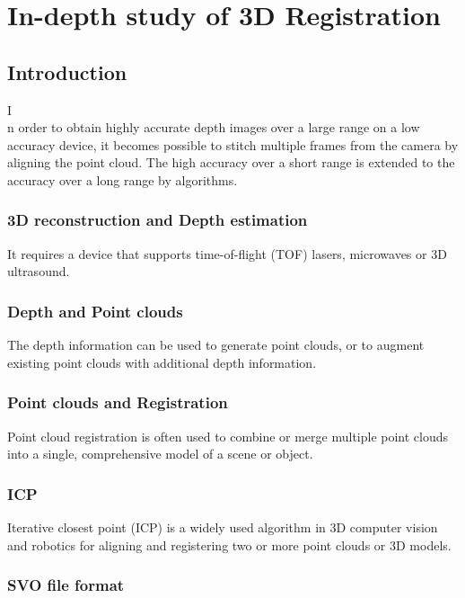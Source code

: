 \chapter{In-depth study of 3D Registration}

\section{Introduction}
\lettrine[lines=2]{I}\\n order to obtain highly accurate depth images over a large range on a low accuracy device, it becomes possible to stitch multiple frames from the camera by aligning the point cloud.
The high accuracy over a short range is extended to the accuracy over a long range by algorithms.

\subsection{3D reconstruction and Depth estimation}
 
It requires a device that supports time-of-flight (TOF) lasers, microwaves or 3D ultrasound. 

\subsection{Depth and Point clouds}

The depth information can be used to generate point clouds, or to augment existing point clouds with additional depth information. 

\subsection{Point clouds and Registration}

Point cloud registration is often used to combine or merge multiple point clouds into a single, comprehensive model of a scene or object. 

\subsection{ICP}

Iterative closest point (ICP) is a widely used algorithm in 3D computer vision and robotics for aligning and registering two or more point clouds or 3D models. 

\subsection{SVO file format}

